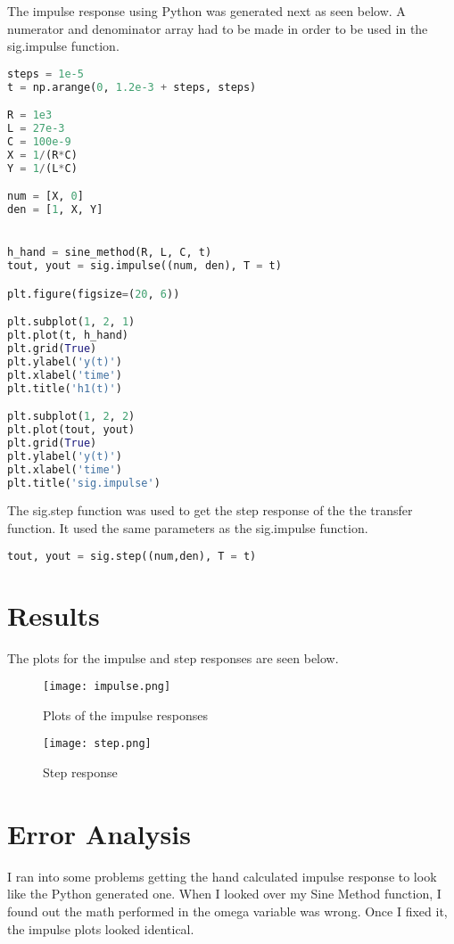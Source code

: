 \documentclass[12pt]{report}
\begin{document}
The impulse response using Python was generated next as seen below. A numerator and denominator array had to be made in order to be used in the sig.impulse function.

\begin{lstlisting}[language=Python, caption=sig.impulse function]
steps = 1e-5
t = np.arange(0, 1.2e-3 + steps, steps)

R = 1e3
L = 27e-3
C = 100e-9
X = 1/(R*C)
Y = 1/(L*C)

num = [X, 0]
den = [1, X, Y]


h_hand = sine_method(R, L, C, t)
tout, yout = sig.impulse((num, den), T = t)

plt.figure(figsize=(20, 6))

plt.subplot(1, 2, 1)
plt.plot(t, h_hand)
plt.grid(True)
plt.ylabel('y(t)')
plt.xlabel('time')
plt.title('h1(t)')

plt.subplot(1, 2, 2)
plt.plot(tout, yout)
plt.grid(True)
plt.ylabel('y(t)')
plt.xlabel('time')
plt.title('sig.impulse')
\end{lstlisting}

The sig.step function was used to get the step response of the the transfer function. It used the same parameters as the sig.impulse function.

\begin{lstlisting}[language=Python, caption=sig.step function]
tout, yout = sig.step((num,den), T = t)
\end{lstlisting}

\section{Results}
The plots for the impulse and step responses are seen below.

\begin{figure}[htp]
    \centering
    \texttt{[image: impulse.png]}
    \caption{Plots of the impulse responses}
\end{figure}

\begin{figure}[htp]
    \centering
    \texttt{[image: step.png]}
    \caption{Step response}
\end{figure}

\pagebreak
\section{Error Analysis}
I ran into some problems getting the hand calculated impulse response to look like the Python generated one. When I looked over my Sine Method function, I found out the math performed in the omega variable was wrong. Once I fixed it, the impulse plots looked identical.
\end{document}
